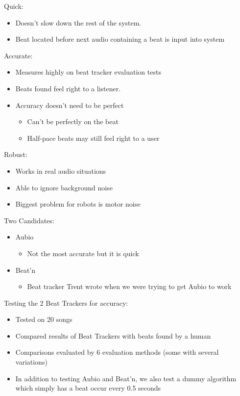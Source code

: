 \documentclass{beamer}
\begin{document}
	\begin{frame}
		Quick:
		\begin{itemize}
			\item Doesn't slow down the rest of the system.
			\item Beat located before next audio containing a beat is input into system
		\end{itemize}		
	\end{frame}
	\begin{frame}
		Accurate:
		\begin{itemize}
			\item Measures highly on beat tracker evaluation tests
			\item Beats found feel right to a listener.
			\item Accuracy doesn't need to be perfect
			\begin{itemize}
				\item Can't be perfectly on the beat
				\item Half-pace beats may still feel right to a user
			\end{itemize}	
		\end{itemize}		
	\end{frame}
	\begin{frame}
		Robust:
		\begin{itemize}
			\item Works in real audio situations
			\item Able to ignore background noise
			\item Biggest problem for robots is motor noise
		\end{itemize}		
	\end{frame}
	\begin{frame}
		Two Candidates:
		\begin{itemize}
			\item Aubio
				\begin{itemize}
					\item Not the most accurate but it is quick
				\end{itemize}
			\item Beat'n
				\begin{itemize}
					\item Beat tracker Trent wrote when we were trying to get Aubio to work
				\end{itemize}
		\end{itemize}		
	\end{frame}
	\begin{frame}
		Testing the 2 Beat Trackers for accuracy:
		\begin{itemize}
			\item Tested on 20 songs
			\item Compared results of Beat Trackers with beats found by a human
			\item Comparisons evaluated by 6 evaluation methods (some with several variations)
			\item In addition to testing Aubio and Beat'n, we also test a dummy algorithm which simply has a beat occur every 0.5 seconds
		\end{itemize}		
	\end{frame}
\end{document}
